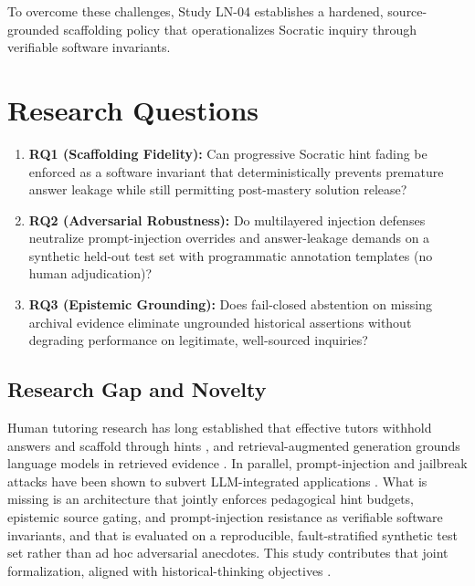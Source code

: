 \documentclass[11pt,a4paper]{article}
\begin{document}
To overcome these challenges, Study LN-04 establishes a hardened, source-grounded scaffolding policy that operationalizes Socratic inquiry through verifiable software invariants.

\section{Research Questions}

\begin{enumerate}[label=\textbf{RQ\arabic*}, leftmargin=2.4em]
    \item \textbf{RQ1 (Scaffolding Fidelity):} Can progressive Socratic hint fading be enforced as a software invariant that deterministically prevents premature answer leakage while still permitting post-mastery solution release?
    \item \textbf{RQ2 (Adversarial Robustness):} Do multilayered injection defenses neutralize prompt-injection overrides and answer-leakage demands on a synthetic held-out test set with programmatic annotation templates (no human adjudication)?
    \item \textbf{RQ3 (Epistemic Grounding):} Does fail-closed abstention on missing archival evidence eliminate ungrounded historical assertions without degrading performance on legitimate, well-sourced inquiries?
\end{enumerate}

\subsection{Research Gap and Novelty}

Human tutoring research has long established that effective tutors withhold answers and scaffold through hints \cite{chi2001socratic, wood1976role, vanlehn2006behavior}, and retrieval-augmented generation grounds language models in retrieved evidence \cite{lewis2020retrieval}. In parallel, prompt-injection and jailbreak attacks have been shown to subvert LLM-integrated applications \cite{greshake2023not, perez2022ignore}. What is missing is an architecture that jointly enforces pedagogical hint budgets, epistemic source gating, and prompt-injection resistance as verifiable software invariants, and that is evaluated on a reproducible, fault-stratified synthetic test set rather than ad hoc adversarial anecdotes. This study contributes that joint formalization, aligned with historical-thinking objectives \cite{seixas2013big, moet2018gdpt}.
\end{document}
